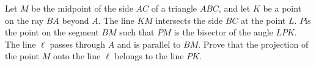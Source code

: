 Let $M$ be the midpoint of the side $AC$ of a triangle $ABC$,  and let $K$ be a point on the ray $BA$ beyond $A$. The line $KM$ intersects the side $BC$ at the point $L$. $P$is the point on the segment $BM$ such that $PM$ is the bisector of the angle $LPK$. The line $\ell$ passes through $A$ and is parallel to $BM$. Prove that the projection of the point $M$ onto the line $\ell$ belongs to the line $PK$.